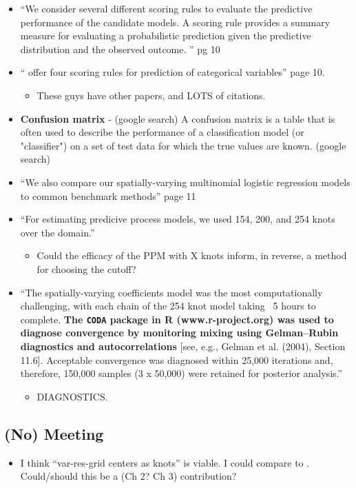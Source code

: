 \documentclass{article}
\begin{document}
\begin{itemize}
\begin{itemize}
    \end{itemize}
\item ``We consider several different scoring rules to evaluate the predictive performance of the candidate models. A scoring rule provides a summary measure for evaluating a probabilistic prediction given the predictive distribution and the observed outcome. '' pg 10
\item ``\cite{Gneiting2007} offer four scoring rules for prediction of categorical variables'' page 10. 
  \begin{itemize}
  \item These guys have other papers, and LOTS of citations.
  \end{itemize}
\item {\bf Confusion matrix} - (google search) A confusion matrix is a table that is often used to describe the performance of a classification model (or "classifier") on a set of test data for which the true values are known. (google search)
\item ``We also compare our spatially-varying multinomial logistic regression models to common benchmark methods'' page 11
\item ``For estimating predicive process models, we used 154, 200, and 254 knots over the domain.''
  \begin{itemize}
  \item Could the efficacy of the PPM with X knots inform, in reverse, a method for choosing the cutoff?
  \end{itemize}
\item ``The spatially-varying coefficients model was the most computationally challenging, with each chain of the 254 knot model taking ~5 hours to complete. {\bf The \verb|CODA| package in R (www.r-project.org) was used to diagnose convergence by monitoring mixing using Gelman–Rubin diagnostics and autocorrelations} [see, e.g., Gelman et al. (2004), Section 11.6]. Acceptable convergence was diagnosed within 25,000 iterations and, therefore, 150,000 samples (3 x 50,000) were retained for posterior analysis.''
  \begin{itemize}
  \item DIAGNOSTICS. 
  \end{itemize}
\end{itemize}

\subsection*{(No) Meeting}
\begin{itemize}
\item I think ``var-res-grid centers as knots'' is viable. I could compare to \cite{Nychka1998}. Could/should this be a (Ch 2? Ch 3) contribution? 
\end{itemize}
\end{document}
